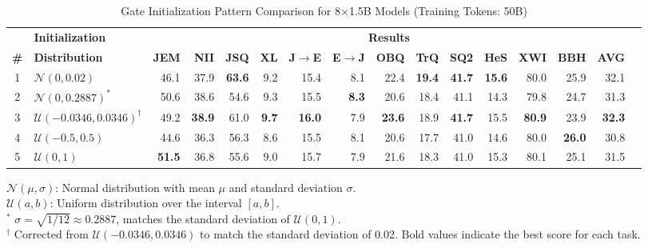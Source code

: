 \begin{table}[t]
\caption{Gate Initialization Pattern Comparison for 8×1.5B Models (Training Tokens: 50B)}
\label{tab:gate-initialization-comparison}
\centering
\small
\renewcommand{\arraystretch}{1.03}
\tabcolsep=0.11cm
\begin{adjustbox}{width=\linewidth}
\begin{tabular}{cl*{13}{r}r}
\toprule
& \textbf{Initialization} & \multicolumn{13}{c}{\textbf{Results}} \\
\cmidrule(lr){2-2} \cmidrule(lr){3-15}
\textbf{\#} & \textbf{Distribution} & \textbf{JEM} & \textbf{NII} & \textbf{JSQ} & \textbf{XL} & \textbf{J$\to$E} & \textbf{E$\to$J} & \textbf{OBQ} & \textbf{TrQ} & \textbf{SQ2} & \textbf{HeS} & \textbf{XWI} & \textbf{BBH} & \textbf{AVG} \\
\midrule
1 & $\mathcal{N}(0, 0.02)$ & 46.1 & 37.9 & \textbf{63.6} & 9.2 & 15.4 & 8.1 & 22.4 & \textbf{19.4} & \textbf{41.7} & \textbf{15.6} & 80.0 & 25.9 & 32.1 \\
2 & $\mathcal{N}(0, 0.2887)^*$ & 50.6 & 38.6 & 54.6 & 9.3 & 15.5 & \textbf{8.3} & 20.6 & 18.4 & 41.1 & 14.3 & 79.8 & 24.7 & 31.3 \\
3 & $\mathcal{U}(-0.0346, 0.0346)^\dagger$  & 49.2 & \textbf{38.9} & 61.0 & \textbf{9.7} & \textbf{16.0} & 7.9 & \textbf{23.6} & 18.9 & \textbf{41.7} & 15.5 & \textbf{80.9} & 23.9 & \textbf{32.3} \\
4 & $\mathcal{U}(-0.5, 0.5)$ & 44.6 & 36.3 & 56.3 & 8.6 & 15.5 & 8.1 & 20.6 & 17.7 & 41.0 & 14.6 & 80.0 & \textbf{26.0} & 30.8 \\
5 & $\mathcal{U}(0, 1)$ & \textbf{51.5} & 36.8 & 55.6 & 9.0 & 15.7 & 7.9 & 21.6 & 18.3 & 41.0 & 15.3 & 80.1 & 25.1 & 31.5 \\
\bottomrule
\end{tabular}
\end{adjustbox}
\raggedright
\small
$\mathcal{N}(\mu, \sigma)$: Normal distribution with mean $\mu$ and standard deviation $\sigma$. \\
$\mathcal{U}(a, b)$: Uniform distribution over the interval $[a, b]$. \\
$^*$ $\sigma = \sqrt{1/12} \approx 0.2887$, matches the standard deviation of $\mathcal{U}(0, 1)$. \\
$^\dagger$ Corrected from $\mathcal{U}(-0.0346, 0.0346)$ to match the standard deviation of 0.02.
Bold values indicate the best score for each task.
\end{table}



